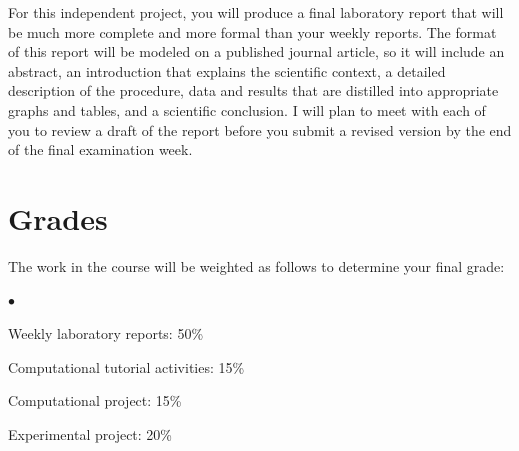\documentclass[11pt]{article}
\newcommand{\squishlist}{
   \begin{list}{$\bullet$}
    { \setlength{\itemsep}{0pt}      \setlength{\parsep}{3pt}
      \setlength{\topsep}{3pt}       \setlength{\partopsep}{0pt}
      \setlength{\leftmargin}{1.5em} \setlength{\labelwidth}{1em}
      \setlength{\labelsep}{0.5em} } }
\newcommand{\squishend}{
    \end{list}  }
\begin{document}
For this independent project, you will produce a final laboratory report 
that will be much more complete and more formal than your weekly reports.
The format of this report will be modeled on a published journal article, 
so it will include an abstract, an introduction that explains the scientific 
context, a detailed description of the procedure, data and results that are 
distilled into appropriate graphs and tables, and a scientific conclusion.
I will plan to meet with each of you to review a draft of the report before
you submit a revised version by the end of the final examination week.

\section{Grades}
\noindent The work in the course will be weighted as follows to determine
your final grade:
\squishlist
\item Weekly laboratory reports: 50\%
\item Computational tutorial activities: 15\%
\item Computational project: 15\%
\item Experimental project: 20\%
\squishend
\end{document}
